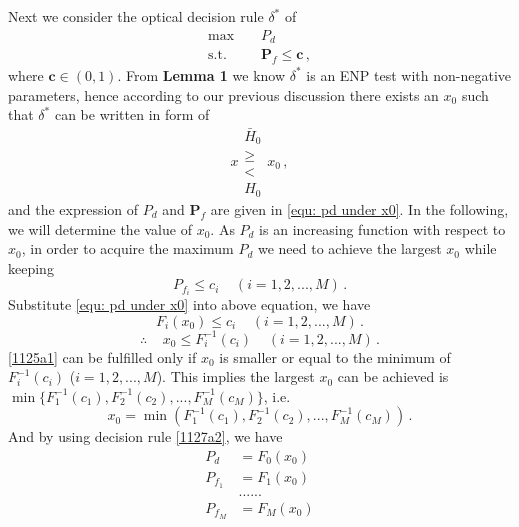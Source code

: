   Next we consider the optical decision rule $\delta^\ast$ of
  \begin{equation}
	\begin{split}
	  \max\;\;\;\; &P_d\\
	  \text{s.t.}\;\;\;\;&\mathbf{P}_f \leq \mathbf{c}\,,
	\end{split}
  \end{equation}
  where $\mathbf{c} \in (0, 1)$.
  From \textbf{Lemma 1} we know $\delta^\ast$ is an ENP test with non-negative parameters, hence according to our previous discussion there exists an $x_0$ such that $\delta^\ast$ can be written in form of 
  \begin{equation}
	\label{1124a1}
	x\substack{\bar{H}_0 \\\geq\\< \\H_0}x_0\,,
  \end{equation}
  and the expression of $P_d$ and $\mathbf{P}_f$ are given in \eqref{equ: pd under x0}. 
  In the following, we will determine the value of $x_0$. 
  As $P_d$ is an increasing function with respect to $x_0$, in order to acquire the maximum $P_d$ we need to achieve the largest $x_0$ while keeping 
  \begin{equation}
	P_{f_i} \leq c_i\;\;\;\;(i = 1, 2, ..., M)\,.
  \end{equation}
  Substitute \eqref{equ: pd under x0} into above equation, we have
  \begin{equation}
	F_i(x_0) \leq c_i \;\;\;\;(i=1, 2, ..., M)\,.
  \end{equation}
  \begin{equation}
	\label{1125a1}
	\therefore\;\;\;\; x_0 \leq F^{-1}_{i}(c_i) \;\;\;\;(i=1, 2, ..., M)\,.
  \end{equation}
  \eqref{1125a1} can be fulfilled only if $x_0$ is 
  smaller or equal to the minimum of $F^{-1}_{i}(c_i)$ ($i=1, 2, ..., M$). This implies the largest $x_0$ can be achieved is $\min\{F_1^{-1}(c_1), F_2^{-1}(c_2), ..., F_M^{-1}(c_M)\}$, i.e.
  \begin{equation}
	\label{1127a2}
	x_0 = \min(F_1^{-1}(c_1), F_2^{-1}(c_2), ..., F_M^{-1}(c_M))\,.
  \end{equation}
  And by  using decision rule \eqref{1127a2}, we have
  \begin{equation}
	\begin{split}
	  \label{equ: pd under x00}
	  P_d &=  F_0(x_0)\\
	  P_{f_1} &=  F_1(x_0)\\
	  &......\\
	  P_{f_M} &= F_M(x_0)
	\end{split}
  \end{equation}
  \typeout{}
  

  \typeout{}
  
